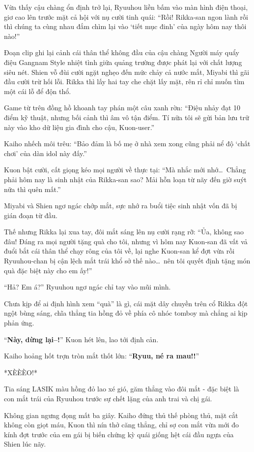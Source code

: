 \documentclass[../main.tex]{subfiles}
\begin{document}
Vừa thấy cậu chàng ổn định trở lại, Ryuuhou liền bấm vào màn hình điện thoại, giơ cao lên trước mặt cả hội với nụ cười tinh quái: ``Rồi! Rikka-san ngon lành rồi thì chúng ta cùng nhau đắm chìm lại vào `tiết mục đinh' của ngày hôm nay thôi nào!''

Đoạn clip ghi lại cảnh cái thân thể không đầu của cậu chàng Người máy quẩy điệu Gangnam Style nhiệt tình giữa quảng trường được phát lại với chất lượng siêu nét. Shien vỗ đùi cười ngặt nghẹo đến mức chảy cả nước mắt, Miyabi thì gãi đầu cười trừ hối lỗi. Rikka thì lấy hai tay che chặt lấy mặt, rên rỉ chỉ muốn tìm một cái lỗ để độn thổ.

Game từ trên đồng hồ khoanh tay phán một câu xanh rờn: ``Điệu nhảy đạt 10 điểm kỹ thuật, nhưng bối cảnh thì âm vô tận điểm. Tí nữa tôi sẽ gửi bản lưu trữ này vào kho dữ liệu gia đình cho cậu, Kuon-user.''

Kaiho nhếch môi trêu: ``Bảo đảm là bố mẹ ở nhà xem xong cũng phải nể độ `chất chơi' của dàn idol này đấy.''

Kuon bật cười, cất giọng kéo mọi người về thực tại: ``Mà nhắc mới nhớ\dots\ Chẳng phải hôm nay là sinh nhật của Rikka-san sao? Mải hỗn loạn từ nãy đến giờ suýt nữa thì quên mất.''

Miyabi và Shien ngơ ngác chớp mắt, sực nhớ ra buổi tiệc sinh nhật vốn đã bị gián đoạn từ đầu.

Thế nhưng Rikka lại xua tay, đôi mắt sáng lên nụ cười rạng rỡ: ``Ủa, không sao đâu! Đáng ra mọi người tặng quà cho tôi, nhưng vì hôm nay Kuon-san đã vất vả đuổi bắt cái thân thể chạy rông của tôi về, lại nghe Kuon-san kể đợt vừa rồi Ryuuhou-chan bị cận lệch mắt trái khổ sở thế nào\dots\ nên tôi quyết định tặng món quà đặc biệt này cho em ấy!''

``Hả? Em á?'' Ryuuhou ngơ ngác chỉ tay vào mũi mình.

Chưa kịp để ai định hình xem ``quà'' là gì, cái mặt dây chuyền trên cổ Rikka đột ngột bùng sáng, chĩa thẳng tia hồng đỏ về phía cô nhóc tomboy mà chẳng ai kịp phản ứng.

``\textbf{Này, dừng lại--!}'' Kuon hét lên, lao tới định cản.

Kaiho hoảng hốt trợn tròn mắt thốt lớn: ``\textbf{Ryuu, né ra mau!!}''

*XÈÈÈO!*

Tia sáng LASIK màu hồng đỏ lao xé gió, găm thẳng vào đôi mắt - đặc biệt là con mắt trái của Ryuuhou trước sự chết lặng của anh trai và chị gái.

Không gian ngưng đọng mất ba giây. Kaiho đứng thủ thế phòng thủ, mặt cắt không còn giọt máu, Kuon thì nín thở căng thẳng, chỉ sợ con mắt vừa mới đo kính đợt trước của em gái bị biến chứng kỳ quái giống hệt cái đầu ngựa của Shien lúc nãy.
\end{document}
